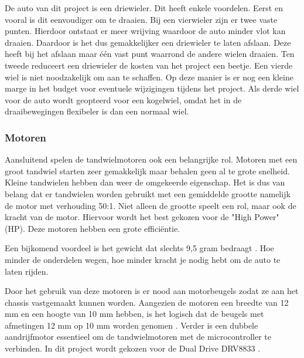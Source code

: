 \documentclass[a4paper,twoside,kulak]{kulakreport} %
\begin{document}
De auto van dit project is een driewieler. Dit heeft enkele voordelen. Eerst en vooral is dit eenvoudiger om te draaien. Bij een vierwieler zijn er twee vaste punten. Hierdoor ontstaat er meer wrijving waardoor de auto minder vlot kan draaien. Daardoor is het dus gemakkelijker een driewieler te laten afslaan. Deze heeft bij het afslaan maar één vast punt waarrond de andere wielen draaien. 
Ten tweede reduceert een driewieler de kosten van het project een beetje. Een vierde wiel is niet noodzakelijk om aan te schaffen. Op deze manier is er nog een kleine marge in het budget voor eventuele wijzigingen tijdens het project. Als derde wiel voor de auto wordt geopteerd voor een kogelwiel, omdat het in de draaibewegingen flexibeler is dan een normaal wiel.
\label{Wielen}


\subsubsection{Motoren}
Aansluitend spelen de tandwielmotoren ook een belangrijke rol. Motoren met een groot tandwiel starten zeer gemakkelijk maar behalen geen al te grote snelheid. Kleine tandwielen hebben dan weer de omgekeerde eigenschap. Het is dus van belang dat er tandwielen worden gebruikt met een gemiddelde grootte namelijk de motor met verhouding 50:1. Niet alleen de grootte speelt een rol, maar ook de kracht van de motor. Hiervoor wordt het best gekozen voor de "High Power" (HP). Deze motoren hebben een grote efficiëntie. 

Een bijkomend voordeel is het gewicht dat slechts 9,5 gram bedraagt \cite{MicroMetalGearMotor50:1HP}. %
Hoe minder de onderdelen wegen, hoe minder kracht je nodig hebt om de auto te laten rijden. 

Door het gebruik van deze motoren is er nood aan motorbeugels zodat ze aan het chassis vastgemaakt kunnen worden. Aangezien de motoren een breedte van 12 mm en een hoogte van 10 mm hebben, is het logisch dat de beugels met afmetingen 12 mm op 10 mm worden genomen \cite{MicroMetalGearMotorBeugel}.
Verder is een dubbele aandrijfmotor essentieel om de tandwielmotoren met de microcontroller te verbinden. In dit project wordt gekozen voor de Dual Drive DRV8833 \cite{DualDriveDRV8833}. 
\label{Motoren}
\end{document}
